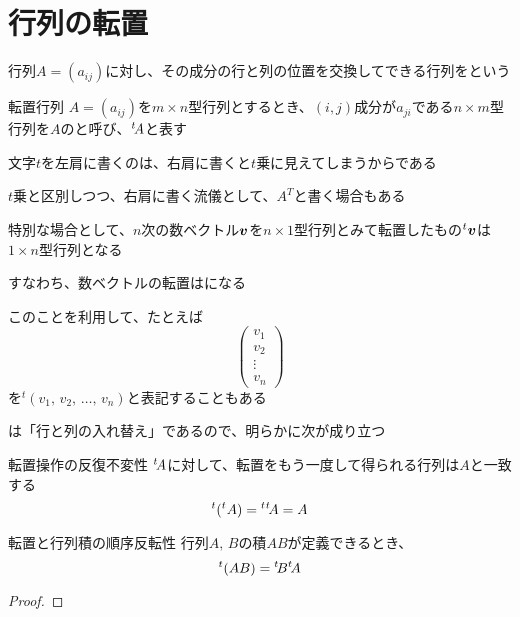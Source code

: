 \documentclass[../../../topic_linear-algebra]{subfiles}
\begin{document}
\sectionline
\section{行列の転置}

行列$A=(a_{ij})$に対し、その成分の行と列の位置を交換してできる行列をという

\begin{definition}{転置行列}
  $A = (a_{ij})$を$m \times n$型行列とするとき、$(i,j)$成分が$a_{ji}$である$n \times m$型行列を$A$のと呼び、${}^t\! A$と表す
\end{definition}

文字$t$を左肩に書くのは、右肩に書くと$t$乗に見えてしまうからである

$t$乗と区別しつつ、右肩に書く流儀として、$A^T$と書く場合もある

\sectionline

特別な場合として、$n$次の数ベクトル$\vb*{v}$を$n \times 1$型行列とみて転置したもの${}^t\vb*{v}$は$1 \times n$型行列となる

すなわち、数ベクトルの転置はになる

\br

このことを利用して、たとえば
\begin{equation*}
  \begin{pmatrix}
    v_1    \\
    v_2    \\
    \vdots \\
    v_n
  \end{pmatrix}
\end{equation*}
を${}^t (v_1,\,v_2,\,\ldots,\,v_n)$と表記することもある

\sectionline

は「行と列の入れ替え」であるので、明らかに次が成り立つ

\begin{theorem}{転置操作の反復不変性}
  ${}^t\! A$に対して、転置をもう一度して得られる行列は$A$と一致する
  \begin{equation*}
    {}^t ({}^t A) = {}^t{}^t\! A = A
  \end{equation*}
\end{theorem}

\sectionline

\begin{theorem}{転置と行列積の順序反転性}\label{thm:transpose-of-product}
  行列$A,\,B$の積$AB$が定義できるとき、
  \begin{equation*}
    {}^t (AB) = {}^t\! B {}^t\! A
  \end{equation*}
\end{theorem}

\begin{proof}
\end{proof}
\end{document}
